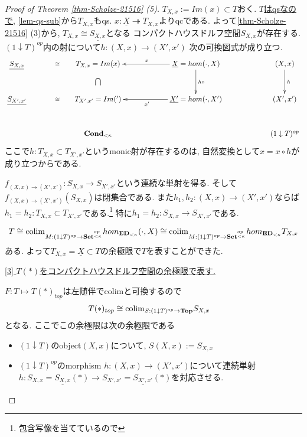 \documentclass[dvipdfmx,a4paper,11pt]{report}
\newcommand{\colim}{{\rm colim}}
\theoremstyle{definition}
\begin{document}
\begin{proof}[Proof of Theorem \ref{thm-Scholze-21516} (5)]
$T_{X,x}:= Im(x) \subset T$おく. 
\underline{$T$はqsなので}, \ref{lem-qs-sub}から$T_{X,x}$もqs. $x : \underline{X} \twoheadrightarrow T_{X,x}$よりqcである. 
よって\ref{thm-Scholze-21516} (3)から, $T_{X, x} \cong \underline{S_{X,x}}$となる
コンパクトハウスドルフ空間$S_{X,x}$が存在する. 
$( 1\downarrow T)^{op}$内の射について$h : (X,x) \to (X', x')$ 次の可換図式が成り立つ.
\begin{equation*}
\xymatrix@C=60pt@R=30pt{
\underline{S_{X,x}}\ar@{}[r]|{\cong} 
&T_{X, x} = Im(x) \ar@{}[d]|{\bigcap}
&\underline{X} = hom (\cdot, X)\ar@{->}[l]_{x} \ar@{->}[d]^{h \circ }
& (X, x)  \ar@{->}[d]^{h}
\\
\underline{S_{X',x'}}\ar@{}[r]|{\cong} 
&T_{X', x'}= Im(')
&\underline{X'} = hom (\cdot, X')\ar@{->}[l]^{x'}
& (X' , x')
 \\   
&{\bf Cond}_{< \kappa}
& 
& ( 1\downarrow T)^{op}
 \\   
}
\end{equation*}
ここで$h : T_{X, x} \subset T_{X', x'}$というmonic射が存在するのは, 
自然変換として$x = x \circ h$が成り立つからである.

$f_{(X,x) \to (X' , x')}:  S_{X,x} \to S_{X', x'}$という連続な単射を得る. 
そして$f_{(X,x) \to (X' , x')}(S_{X,x})$は閉集合である. 
また$h_1,h_2 : (X,x) \to (X', x')$ならば$h_1 = h_2 : T_{X, x} \subset T_{X', x'}$である.\footnote{包含写像を当てているので} 特に$h_1 = h_2: S_{X,x} \to S_{X', x'}$である. 


$$
T \cong  
\colim_{M : ( 1\downarrow T)^{op}\to  {\bf Set }^{{\bf }_{<\kappa}^{op}}}
hom_{ {\bf ED}_{<\kappa}}(\cdot, X)
\cong 
\colim_{M : ( 1\downarrow T)^{op}\to  {\bf Set }^{{\bf }_{<\kappa}^{op}}}
hom_{ {\bf ED}_{<\kappa}}T_{X,x}
$$
ある.
よって$T_{X,x}= \underline{X} \subset T$の余極限で$T$を表すことができた. 

\underline{[3] $T(\ast)$をコンパクトハウスドルフ空間の余極限で表す.}

$F : T \mapsto T(\ast)_{top}$は左随伴でcolimと可換するので
\begin{align*}
\begin{split}
T(\ast)_{top}
&\cong 
\colim_{S : ( 1\downarrow T)^{op} \to {\bf Top}}S_{X,x}
\end{split}
\end{align*}
となる.
 ここでこの余極限は次の余極限である
 \begin{itemize}
 \item $( 1\downarrow T)$のobject$(X,x)$について, $S(X,x) := S_{X,x}$
 \item $( 1\downarrow T)^{op}$のmorphism $h : (X,x) \to (X',x') $について連続単射
 $h : S_{X,x}=\underline{S_{X,x}}(\ast) \to S_{X',x'}=\underline{S_{X',x'}}(\ast)$を対応させる. 
 \end{itemize}
 

\end{proof}
\end{document}
